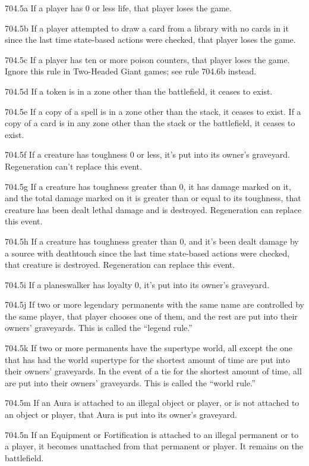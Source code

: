 704.5a If a player has 0 or less life, that player loses the game.

704.5b If a player attempted to draw a card from a library with no cards in it since the last time state-based actions were checked, that player loses the game.

704.5c If a player has ten or more poison counters, that player loses the game. Ignore this rule in Two-Headed Giant games; see rule 704.6b instead.

704.5d If a token is in a zone other than the battlefield, it ceases to exist.

704.5e If a copy of a spell is in a zone other than the stack, it ceases to exist. If a copy of a card is in any zone other than the stack or the battlefield, it ceases to exist.

704.5f If a creature has toughness 0 or less, it’s put into its owner’s graveyard. Regeneration can’t replace this event.

704.5g If a creature has toughness greater than 0, it has damage marked on it, and the total damage marked on it is greater than or equal to its toughness, that creature has been dealt lethal damage and is destroyed. Regeneration can replace this event.

704.5h If a creature has toughness greater than 0, and it’s been dealt damage by a source with deathtouch since the last time state-based actions were checked, that creature is destroyed. Regeneration can replace this event.

704.5i If a planeswalker has loyalty 0, it’s put into its owner’s graveyard.

704.5j If two or more legendary permanents with the same name are controlled by the same player, that player chooses one of them, and the rest are put into their owners’ graveyards. This is called the “legend rule.”

704.5k If two or more permanents have the supertype world, all except the one that has had the world supertype for the shortest amount of time are put into their owners’ graveyards. In the event of a tie for the shortest amount of time, all are put into their owners’ graveyards. This is called the “world rule.”

704.5m If an Aura is attached to an illegal object or player, or is not attached to an object or player, that Aura is put into its owner’s graveyard.

704.5n If an Equipment or Fortification is attached to an illegal permanent or to a player, it becomes unattached from that permanent or player. It remains on the battlefield.

